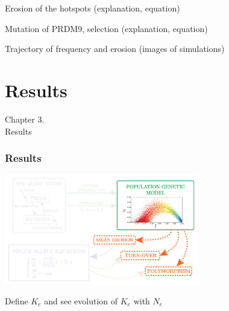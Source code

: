 \documentclass[10pt]{beamer}
\begin{document}
\begin{frame}
	\begin{center}
		\Large
    Erosion of the hotspots (explanation, equation)
	\end{center}
\end{frame}

\begin{frame}
	\begin{center}
		\Large
    Mutation of PRDM9, selection (explanation, equation)
	\end{center}
\end{frame}

\begin{frame}
	\begin{center}
		\Large
    Trajectory of frequency and erosion (images of simulations)
	\end{center}
\end{frame}

\section{Results}

\begin{frame}
	\begin{center}
	\huge
	Chapter 3. \\
       Results
	\end{center}
\end{frame}


\begin{frame}
\frametitle{Results}
	\begin{center}
       \includegraphics[width=8.5cm]{Images/overline-3.png}
	\end{center}
\end{frame}

\begin{frame}
	\begin{center}
	\Large
    Define $K_e$ and see evolution of $K_e$ with $N_e$
	\end{center}
\end{frame}
\end{document}
